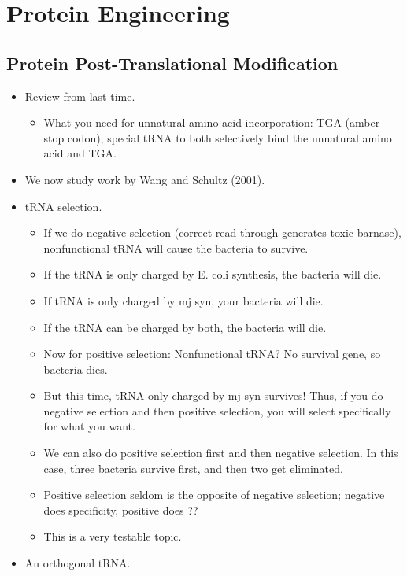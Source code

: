 \documentclass[../notes.tex]{subfiles}
\begin{document}
\chapter{Protein Engineering}
\section{Protein Post-Translational Modification}
\begin{itemize}
    \item {}Review from last time.
    \begin{itemize}
        \item What you need for unnatural amino acid incorporation: TGA (amber stop codon), special tRNA to both selectively bind the unnatural amino acid and TGA.
    \end{itemize}
    \item We now study work by Wang and Schultz (2001).
    \item tRNA selection.
    \begin{itemize}
        \item If we do negative selection (correct read through generates toxic barnase), nonfunctional tRNA will cause the bacteria to survive.
        \item If the tRNA is only charged by E. coli synthesis, the bacteria will die.
        \item If tRNA is only charged by mj syn, your bacteria will die.
        \item If the tRNA can be charged by both, the bacteria will die.
        \item Now for positive selection: Nonfunctional tRNA? No survival gene, so bacteria dies.
        \item But this time, tRNA only charged by mj syn survives! Thus, if you do negative selection and then positive selection, you will select specifically for what you want.
        \item We can also do positive selection first and then negative selection. In this case, three bacteria survive first, and then two get eliminated.
        \item Positive selection seldom is the opposite of negative selection; negative does specificity, positive does ??
        \item This is a very testable topic.
    \end{itemize}
    \item An orthogonal tRNA.
    \begin{itemize}

\end{itemize}
\end{itemize}
\end{document}
